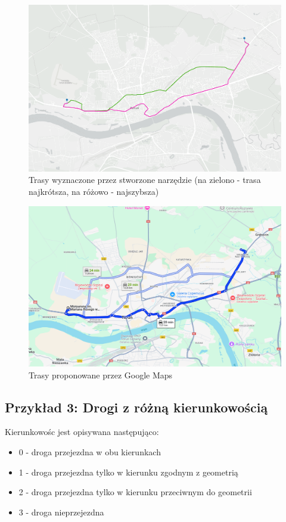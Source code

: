 \documentclass{article}
\begin{document}
\begin{figure}[H]
    \centering
    \includegraphics[width=1\textwidth]{img/motoarena-rod.png}
    \caption{Trasy wyznaczone przez stworzone narzędzie (na zielono - trasa najkrótsza, na różowo - najszybsza)}
\end{figure}

\begin{figure}[H]
    \centering
    \includegraphics[width=1\textwidth]{img/motoarena-rod-google.png}
    \caption{Trasy proponowane przez Google Maps}
\end{figure}

\subsection{Przykład 3: Drogi z różną kierunkowością}
Kierunkowośc jest opisywana następująco:
\begin{itemize}
    \item 0 - droga przejezdna w obu kierunkach
    \item 1 - droga przejezdna tylko w kierunku zgodnym z geometrią
    \item 2 - droga przejezdna tylko w kierunku przeciwnym do geometrii
    \item 3 - droga nieprzejezdna
\end{itemize}
\end{document}
